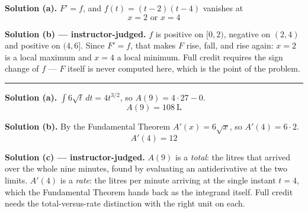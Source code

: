 \documentclass[12pt]{article}
\begin{document}
\textbf{Solution (a).} $F' = f$, and $f(t) = (t-2)(t-4)$ vanishes at
\[ \boxed{x = 2 \text{ or } x = 4} \]

\textbf{Solution (b) --- instructor-judged.} $f$ is positive on $[0,2)$,
negative on $(2,4)$ and positive on $(4,6]$. Since $F' = f$, that makes $F$ rise,
fall, and rise again: $x = 2$ is a local maximum and $x = 4$ a local minimum.
Full credit requires the sign change of $f$ --- $F$ itself is never computed
here, which is the point of the problem.

\vspace{0.15cm}\noindent\rule{\linewidth}{0.2pt}


\textbf{Solution (a).} $\int 6\sqrt{t}\,dt = 4t^{3/2}$, so
$A(9) = 4\cdot 27 - 0$.
\[ \boxed{A(9) = 108\ \text{L}} \]

\textbf{Solution (b).} By the Fundamental Theorem $A'(x) = 6\sqrt{x}$, so
$A'(4) = 6\cdot 2$.
\[ \boxed{A'(4) = 12} \]

\textbf{Solution (c) --- instructor-judged.} $A(9)$ is a \emph{total}: the
litres that arrived over the whole nine minutes, found by evaluating an
antiderivative at the two limits. $A'(4)$ is a \emph{rate}: the litres per
minute arriving at the single instant $t = 4$, which the Fundamental Theorem
hands back as the integrand itself. Full credit needs the total-versus-rate
distinction with the right unit on each.
\end{document}
